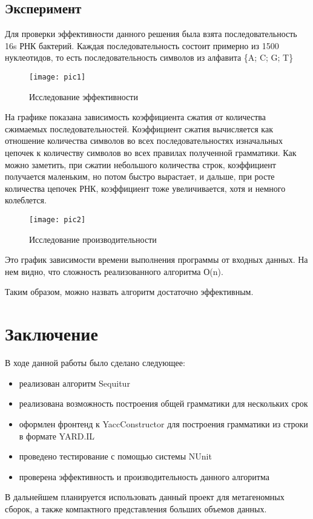 \documentclass[14pt]{matmex-diploma}
\begin{document}
    \subsection{Эксперимент}
    

    Для проверки эффективности данного решения была взята последовательность 16s РНК бактерий. Каждая последовательность состоит примерно из 1500 нуклеотидов, то есть последовательность символов из алфавита \{A; C; G; T\}
\begin{figure}[h]
    \label{13} 
    \centering 
	\texttt{[image: pic1]}
	\caption{Исследование эффективности}
\end{figure}
    
    
    На графике показана зависимость коэффициента сжатия от количества сжимаемых последовательностей. Коэффициент сжатия вычисляется как отношение количества символов во всех последовательностях изначальных цепочек к количеству символов во всех правилах полученной грамматики. Как можно заметить, при сжатии небольшого количества строк, коэффициент получается маленьким, но потом быстро вырастает,  и дальше, при росте количества цепочек РНК, коэффициент тоже увеличивается, хотя и немного колеблется.
\begin{figure}[h]
    \centering
	\texttt{[image: pic2]}
	\caption{Исследование производительности}
\end{figure}

    Это график зависимости времени выполнения программы от входных данных. На нем видно, что сложность реализованного алгоритма О(n). 
    
    Таким образом, можно назвать алгоритм достаточно эффективным.



\section{Заключение}
В ходе данной работы было сделано следующее:
\begin{itemize}
    \item реализован алгоритм Sequitur
    \item реализована возможность построения общей грамматики для нескольких срок 
    \item оформлен фронтенд к YaccConstructor для построения грамматики из строки в формате YARD.IL
    \item проведено тестирование с помощью системы NUnit
    \item проверена эффективность и производительность данного алгоритма
\end{itemize}

В дальнейшем планируется использовать данный проект для метагеномных сборок, а также компактного представления больших объемов данных.

\setmonofont[Mapping=tex-text]{CMU Typewriter Text}


\end{document}
